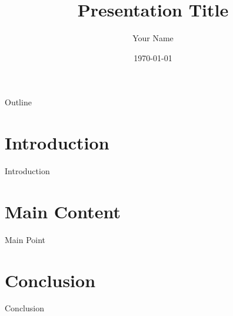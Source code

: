 \documentclass{beamer}
\title{Presentation Title}
\author{Your Name}
\date{\today}
\begin{document}
\begin{frame}
  \titlepage
\end{frame}

\begin{frame}{Outline}
  \tableofcontents
\end{frame}

\section{Introduction}
\begin{frame}{Introduction}
\end{frame}

\section{Main Content}
\begin{frame}{Main Point}
\end{frame}

\section{Conclusion}
\begin{frame}{Conclusion}
\end{frame}
\end{document}
